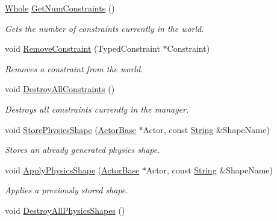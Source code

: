 \begin{DoxyCompactItemize}
\hyperlink{namespacephys_a460f6bc24c8dd347b05e0366ae34f34a}{Whole} \hyperlink{classphys_1_1PhysicsManager_aa21fe7e9349d638020627c58b90faa38}{GetNumConstraints} ()
\begin{DoxyCompactList}\small\item\em Gets the number of constraints currently in the world. \item\end{DoxyCompactList}\item 
void \hyperlink{classphys_1_1PhysicsManager_ace94aa20b5191b01630e7a5046cb7af6}{RemoveConstraint} (TypedConstraint $\ast$Constraint)
\begin{DoxyCompactList}\small\item\em Removes a constraint from the world. \item\end{DoxyCompactList}\item 
void \hyperlink{classphys_1_1PhysicsManager_a34b684f447c56dee94dc80d8df8051eb}{DestroyAllConstraints} ()
\begin{DoxyCompactList}\small\item\em Destroys all constraints currently in the manager. \item\end{DoxyCompactList}\item 
void \hyperlink{classphys_1_1PhysicsManager_aee6b1c15ac2689e8d228ff074f79f224}{StorePhysicsShape} (\hyperlink{classphys_1_1ActorBase}{ActorBase} $\ast$Actor, const \hyperlink{namespacephys_aa03900411993de7fbfec4789bc1d392e}{String} \&ShapeName)
\begin{DoxyCompactList}\small\item\em Stores an already generated physics shape. \item\end{DoxyCompactList}\item 
void \hyperlink{classphys_1_1PhysicsManager_a5b8767880619cefce97218207c251544}{ApplyPhysicsShape} (\hyperlink{classphys_1_1ActorBase}{ActorBase} $\ast$Actor, const \hyperlink{namespacephys_aa03900411993de7fbfec4789bc1d392e}{String} \&ShapeName)
\begin{DoxyCompactList}\small\item\em Applies a previously stored shape. \item\end{DoxyCompactList}\item 
\hypertarget{classphys_1_1PhysicsManager_a51a1fc148baa6d4d32a0f47cbc0dbc97}{
void \hyperlink{classphys_1_1PhysicsManager_a51a1fc148baa6d4d32a0f47cbc0dbc97}{DestroyAllPhysicsShapes} ()}
\label{classphys_1_1PhysicsManager_a51a1fc148baa6d4d32a0f47cbc0dbc97}


\end{DoxyCompactItemize}
